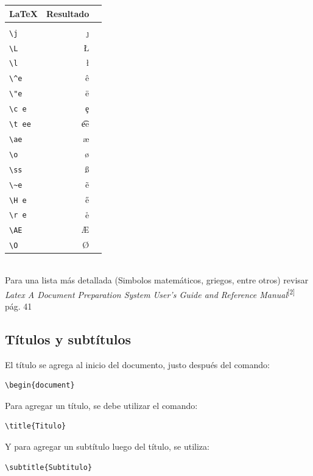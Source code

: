 \documentclass[10pt,journal,compsoc]{IEEEtran}
\begin{document}
\begin{minipage}{0.1\textwidth}
	\begin{tabular}{ l r r }
		\LaTeX & Resultado \\
		\hline\\
		\verb|\j| & \j \\
		\verb|\L| & \L \\
		\verb|\l| & \l \\
		\verb|\^e| & \^e \\
		\verb|\"e| & \"e \\
		\verb|\c e| & \c e \\
		\verb|\t ee|& \t ee \\
		\verb|\ae| & \ae \\
		\verb|\o| & \o \\
		\verb|\ss| & \ss \\
		\verb|\~e| & \~e \\
		\verb|\H e| & \H e \\
		\verb|\r e| & \r e \\
		\verb|\AE| & \AE \\
		\verb|\O|& \O \\
	\end{tabular}
	\hfill
\end{minipage}\\
Para una lista m\'as detallada (Simbolos matem\'aticos, griegos, entre otros) revisar \emph{Latex A Document Preparation System User's Guide and Reference Manual}\textsuperscript{[2]} p\'ag. 41


\subsection{T\'itulos y subt\'itulos}
El t\'itulo se agrega al inicio del documento, justo despu\'es del comando: \\
\begin{lstlisting}
\begin{document}
\end{lstlisting}
Para agregar un t\'itulo, se debe utilizar el comando: \\
\begin{lstlisting}
\title{Titulo}
\end{lstlisting}
Y para agregar un subt\'itulo luego del t\'itulo, se utiliza: \\
\begin{lstlisting}
\subtitle{Subtitulo}
\end{lstlisting}
\end{document}

